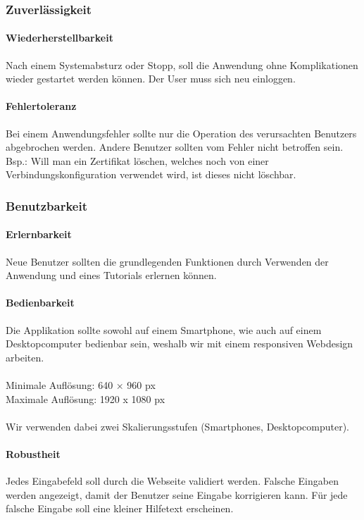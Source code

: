 \subsubsection{Zuverlässigkeit}

\paragraph{Wiederherstellbarkeit}
Nach einem Systemabsturz oder Stopp, soll die Anwendung ohne Komplikationen wieder gestartet werden können. Der User muss sich neu einloggen.

\paragraph{Fehlertoleranz}
Bei einem Anwendungsfehler sollte nur die Operation des verursachten Benutzers abgebrochen werden. Andere Benutzer sollten vom Fehler nicht betroffen sein.\\
Bsp.: Will man ein Zertifikat löschen, welches noch von einer Verbindungskonfiguration verwendet wird, ist dieses nicht löschbar.

\subsubsection{Benutzbarkeit}

\paragraph{Erlernbarkeit}
Neue Benutzer sollten die grundlegenden Funktionen durch Verwenden der Anwendung und eines Tutorials erlernen können.

\paragraph{Bedienbarkeit}
Die Applikation sollte sowohl auf einem Smartphone, wie auch auf einem Desktopcomputer bedienbar sein, weshalb wir mit einem responsiven Webdesign arbeiten. \\\\
Minimale Auflösung: 	640 × 960 px \\
Maximale Auflösung: 	1920 x 1080 px \\\\
Wir verwenden dabei zwei Skalierungsstufen (Smartphones, Desktopcomputer).

\paragraph{Robustheit}
Jedes Eingabefeld soll durch die Webseite validiert werden. Falsche Eingaben werden angezeigt, damit der Benutzer seine Eingabe korrigieren kann. Für jede falsche Eingabe soll eine kleiner Hilfetext erscheinen.

